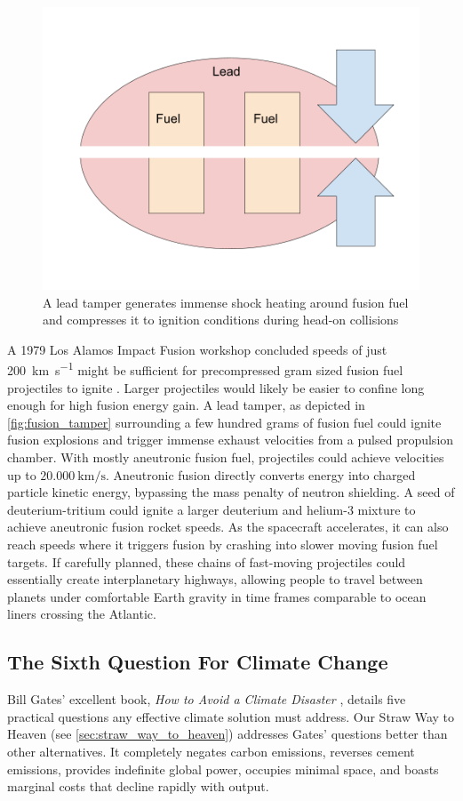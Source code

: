 \documentclass{article}
\begin{document}
\begin{figure}[htpb]
    \centering
    \includegraphics[width=0.5\linewidth]{images/Fusion Impactors.png}
    \caption{A lead tamper generates immense shock heating around fusion fuel and compresses it to ignition conditions during head-on collisions}
    \label{fig:fusion_tamper}
\end{figure}

A 1979 Los Alamos Impact Fusion workshop concluded speeds of just \SI{200}{\kilo\meter\per\second} might be sufficient for precompressed gram sized fusion fuel projectiles to ignite \cite{impactfusion1979}.   Larger projectiles would likely be easier to confine long enough for high fusion energy gain.   A lead tamper, as depicted in \autoref{fig:fusion_tamper} surrounding a few hundred grams of fusion fuel could ignite fusion explosions and trigger immense exhaust velocities from a pulsed propulsion chamber.  
With mostly aneutronic fusion fuel, projectiles could achieve velocities up to $\SI{20,000}{\kilo\meter\per\second}$.  Aneutronic fusion directly converts energy into charged particle kinetic energy, bypassing the mass penalty of neutron shielding.  A seed of deuterium-tritium could ignite a larger deuterium and helium-3 mixture to achieve aneutronic fusion rocket speeds.   As the spacecraft accelerates, it can also reach speeds where it triggers fusion by crashing into slower moving fusion fuel targets.   If carefully planned, these chains of fast-moving projectiles could essentially create interplanetary highways, allowing people to travel between planets under comfortable Earth gravity in time frames comparable to ocean liners crossing the Atlantic. 

\subsection{The Sixth Question For Climate Change}\label{sec:sith_question}
Bill Gates' excellent book, \textit{How to Avoid a Climate Disaster} \cite{gates2021avoid}, details five practical questions \cite{breakthroughenergy_2021_five} any effective climate solution must address. Our Straw Way to Heaven (see \autoref{sec:straw_way_to_heaven}) addresses Gates' questions better than other alternatives. It completely negates carbon emissions, reverses cement emissions, provides indefinite global power, occupies minimal space, and boasts marginal costs that decline rapidly with output.
\end{document}
